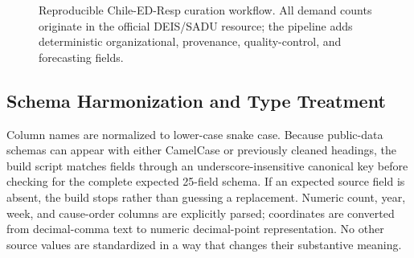 \documentclass[data,datadescriptor,submit,moreauthors,pdftex]{Definitions/mdpi}
\begin{document}
\begin{figure}[H]
\centering
{}
\caption{Reproducible Chile-ED-Resp curation workflow. All demand counts originate in the official DEIS/SADU resource; the pipeline adds deterministic organizational, provenance, quality-control, and forecasting fields.}
\label{fig:pipeline}
\end{figure}

\subsection{Schema Harmonization and Type Treatment}

Column names are normalized to lower-case snake case. Because public-data schemas can appear with either CamelCase or previously cleaned headings, the build script matches fields through an underscore-insensitive canonical key before checking for the complete expected 25-field schema. If an expected source field is absent, the build stops rather than guessing a replacement. Numeric count, year, week, and cause-order columns are explicitly parsed; coordinates are converted from decimal-comma text to numeric decimal-point representation. No other source values are standardized in a way that changes their substantive meaning.
\end{document}
